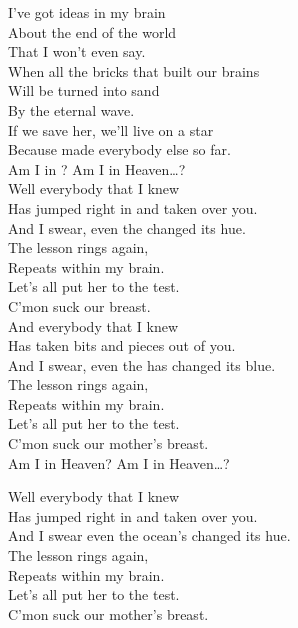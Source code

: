 



I've got ideas in my brain \\
About the end of the world \\
That I won't even say. \\
When all the bricks that built our brains \\
Will be turned into sand \\
By the eternal wave. \\

If we save her, we'll live on a star \\
Because  made everybody else so far. \\

Am I in ? Am I in Heaven…? \\

Well everybody that I knew \\
Has jumped right in and taken over you. \\
And I swear, even the  changed its hue. \\
The lesson rings again, \\
Repeats within my brain. \\
Let's all put her to the test. \\
C'mon suck our  breast. \\

And everybody that I knew \\
Has taken bits and pieces out of you. \\
And I swear, even the  has changed its blue. \\
The lesson rings again, \\
Repeats within my brain. \\
Let's all put her to the test. \\
C'mon suck our mother's breast. \\

Am I in Heaven? Am I in Heaven…?

Well everybody that I knew \\
Has jumped right in and taken over you. \\
And I swear even the ocean's changed its hue. \\
The lesson rings again, \\
Repeats within my brain. \\
Let's all put her to the test. \\
C'mon suck our mother's breast. \\

